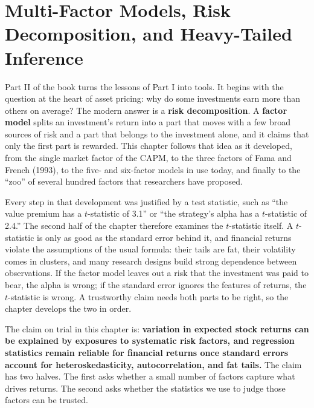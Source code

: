 
\chapter{Multi-Factor Models, Risk Decomposition, and Heavy-Tailed Inference}
\label{ch:03}

Part II of the book turns the lessons of Part I into tools. It begins with the question at the heart of asset pricing: why do some investments earn more than others on average? The modern answer is a \textbf{risk decomposition}. A \textbf{factor model} splits an investment's return into a part that moves with a few broad sources of risk and a part that belongs to the investment alone, and it claims that only the first part is rewarded. This chapter follows that idea as it developed, from the single market factor of the CAPM, to the three factors of Fama and French (1993), to the five- and six-factor models in use today, and finally to the ``zoo'' of several hundred factors that researchers have proposed.

Every step in that development was justified by a test statistic, such as ``the value premium has a $t$-statistic of 3.1'' or ``the strategy's alpha has a $t$-statistic of 2.4.'' The second half of the chapter therefore examines the $t$-statistic itself. A $t$-statistic is only as good as the standard error behind it, and financial returns violate the assumptions of the usual formula: their tails are fat, their volatility comes in clusters, and many research designs build strong dependence between observations. If the factor model leaves out a risk that the investment was paid to bear, the alpha is wrong; if the standard error ignores the features of returns, the $t$-statistic is wrong. A trustworthy claim needs both parts to be right, so the chapter develops the two in order.

The claim on trial in this chapter is: \textbf{variation in expected stock returns can be explained by exposures to systematic risk factors, and regression statistics remain reliable for financial returns once standard errors account for heteroskedasticity, autocorrelation, and fat tails.} The claim has two halves. The first asks whether a small number of factors capture what drives returns. The second asks whether the statistics we use to judge those factors can be trusted.

